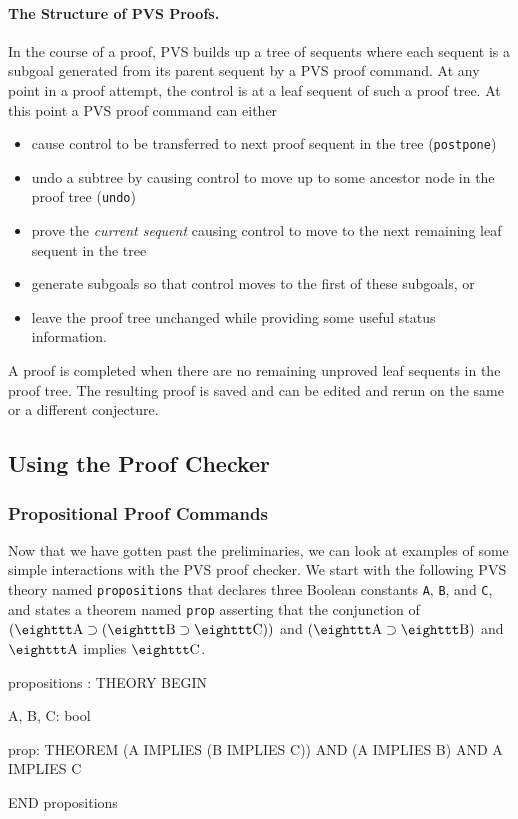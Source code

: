 \paragraph{The Structure of PVS Proofs. }
In the course of a proof, PVS builds up a tree of sequents where
each sequent is a subgoal generated from its parent sequent by a PVS
proof command.  At any point in a proof attempt, the control is at a
leaf sequent of such a proof tree.  At this point a PVS proof command
can either 
\begin{itemize}
  \item  cause control to be transferred to next proof sequent in the
tree ({\tt postpone})
  \item undo a subtree by causing control to move up to some ancestor node
in the proof tree ({\tt undo})
  \item prove the {\em current sequent\/} causing control to move to the
next remaining leaf sequent in the tree
  \item generate subgoals so that control moves to the first of these
subgoals, or
  \item leave the proof tree unchanged while providing some useful status information.
\end{itemize}
A proof is completed when there are no remaining unproved leaf sequents
in the proof tree.  The resulting proof is saved and can be edited and
rerun on the same or a different conjecture.


\subsection{Using the Proof Checker}\label{using}

\subsubsection{Propositional Proof Commands}

Now that we have gotten past the preliminaries, we can look at
examples of some simple interactions with the PVS proof checker.
We start with the following PVS theory named {\tt propositions}
that declares three Boolean constants {\tt A}, {\tt B}, and {\tt C}, and
states a theorem named {\tt prop} asserting that the conjunction of
$( \mbox{\tt A} \supset ( \mbox{\tt B} \supset \mbox{\tt C}))$ and $(
\mbox{\tt A} \supset \mbox{\tt B})$ and $ \mbox{\tt A}$ implies $
\mbox{\tt C}$.

\begin{pvsscript}
propositions : THEORY
  BEGIN

  A, B, C: bool

  prop: THEOREM (A IMPLIES (B IMPLIES C)) AND (A IMPLIES B) AND A
               IMPLIES C

  END propositions
\end{pvsscript}


